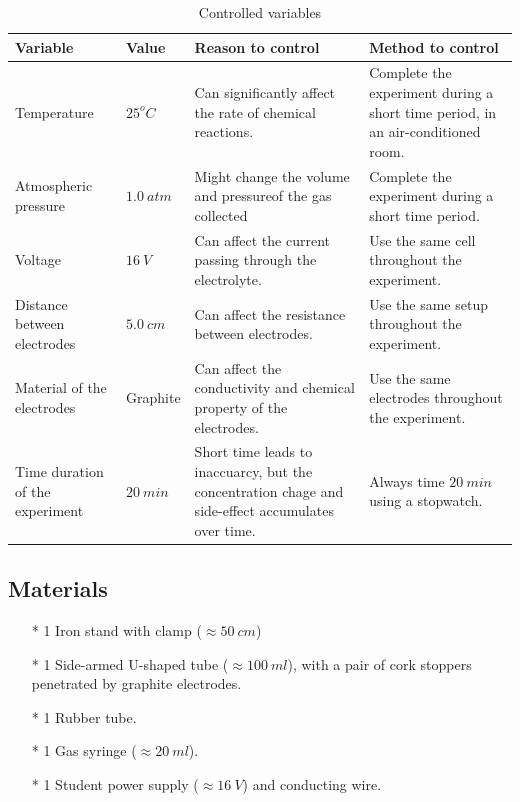 \documentclass[a4paper]{article}
\begin{document}
\begin{table}
    \centering
    \caption{Controlled variables}
    \label{tab.control}
    \begin{tabularx}{1.2\textwidth}{p{2cm} p{1cm} XX}
        \hline
        Variable                    & Value                  & Reason to control                                          & Method to control                                    \\ \hline
        Temperature              & $25^oC$                & Can significantly affect the rate of chemical reactions. & Complete the experiment during a short time period, in an air-conditioned room. \\
        Atmospheric pressure        & $\SI{1.0 }{atm}$       & Might change the volume and pressureof the gas collected      & Complete the experiment during a short time period. \\
        Voltage                     & $\SI{16 }{V}$          & Can affect the current passing through the electrolyte.                             & Use the same cell throughout the experiment. \\
        Distance between electrodes & $\SI{5.0}{cm}$        & Can affect the resistance between electrodes. & Use the same setup throughout the experiment. \\
        Material of the electrodes  & Graphite            & Can affect the conductivity and chemical property of the electrodes. & Use the same electrodes throughout the experiment. \\ 
        Time duration of the experiment & $\SI{20}{min}$ & Short time leads to inaccuarcy, but the concentration chage and side-effect accumulates over time. & Always time $\SI{20}{min}$ using a stopwatch.\\\hline
    \end{tabularx}
\end{table}

\subsection{Materials}

\begin{itemize}
    \item[*] 1 Iron stand with clamp ($\approx \SI{50}{cm}$)
    \item[*] 1 Side-armed U-shaped tube ($\approx \SI{100}{ml}$), with a pair of cork stoppers penetrated by graphite electrodes.
    \item[*] 1 Rubber tube.
    \item[*] 1 Gas syringe ($\approx \SI{20}{ml}$).
    \item[*] 1 Student power supply ($\approx \SI{16}{V}$) and conducting wire.
\end{itemize}
\end{document}
